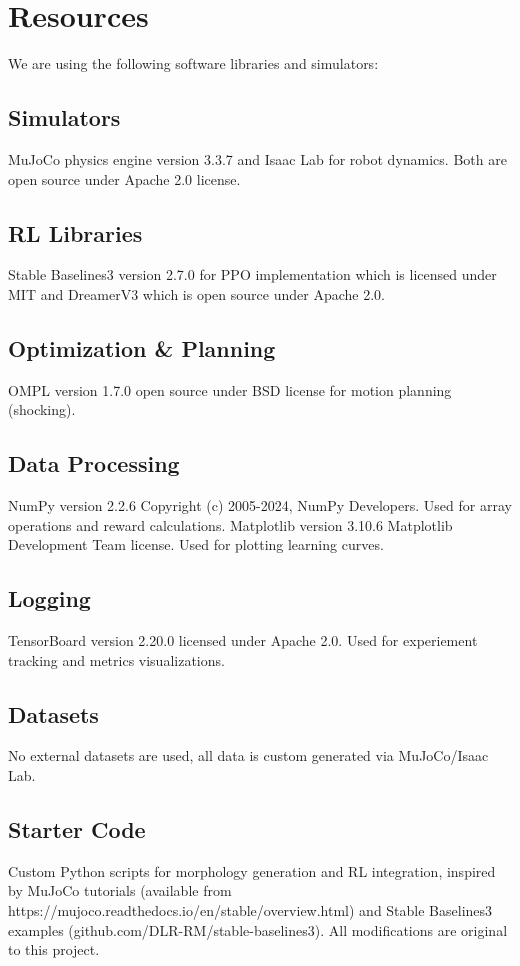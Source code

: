 \documentclass[conference]{IEEEtran}
\begin{document}
\section{Resources}
We are using the following software libraries and simulators:

\subsection{Simulators}
MuJoCo physics engine version 3.3.7 and Isaac Lab for robot dynamics.
Both are open source under Apache 2.0 license.

\subsection{RL Libraries}
Stable Baselines3 version 2.7.0 for PPO implementation which is licensed under MIT and DreamerV3 which is open source under Apache 2.0.

\subsection{Optimization \& Planning}
OMPL version 1.7.0 open source under BSD license for motion planning (shocking).

\subsection{Data Processing}
NumPy version 2.2.6 Copyright (c) 2005-2024, NumPy Developers.
Used for array operations and reward calculations.
Matplotlib version 3.10.6 Matplotlib Development Team license.
Used for plotting learning curves.

\subsection{Logging}
TensorBoard version 2.20.0 licensed under Apache 2.0.
Used for experiement tracking and metrics visualizations.

\subsection{Datasets}
No external datasets are used, all data is custom generated via MuJoCo/Isaac Lab.

\subsection{Starter Code}
Custom Python scripts for morphology generation and RL integration, inspired by MuJoCo tutorials (available from https://mujoco.readthedocs.io/en/stable/overview.html) and Stable Baselines3 examples (github.com/DLR-RM/stable-baselines3).
All modifications are original to this project.
\end{document}
